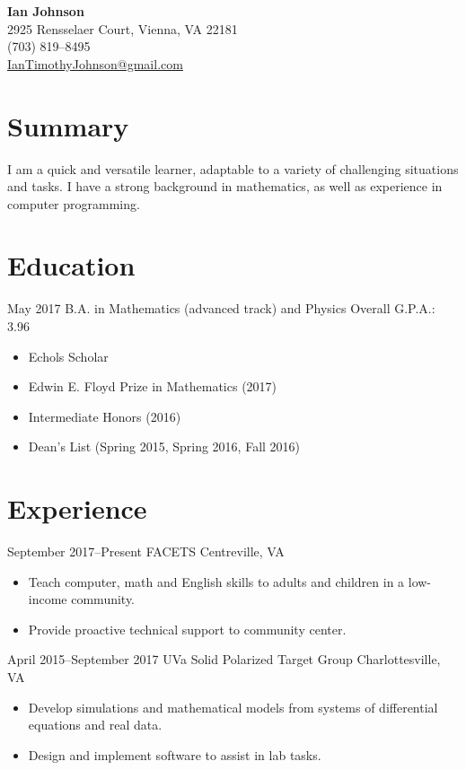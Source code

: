 \documentclass[10pt]{article}
\begin{document}
\begin{center}
  {\Large\bfseries Ian Johnson} \\
  2925 Rensselaer Court, Vienna, VA 22181 \\
  (703) 819--8495 \\
  \href{mailto:IanTimothyJohnson@gmail.com}{IanTimothyJohnson@gmail.com}
\end{center}

\section*{Summary}
I am a quick and versatile learner, adaptable to a variety of challenging
situations and tasks.  I have a strong background in mathematics, as well as
experience in computer programming.

\section*{Education}
{May 2017}
{B.A. in Mathematics (advanced track) and Physics}
{Overall G.P.A.: 3.96}
\begin{itemize}
\item Echols Scholar
\item Edwin E. Floyd Prize in Mathematics (2017)
\item Intermediate Honors (2016)
\item Dean's List (Spring 2015, Spring 2016, Fall 2016)
\end{itemize}

\section*{Experience}
{September 2017--Present}
{FACETS}
{Centreville, VA}
\begin{itemize}
\item Teach computer, math and English skills to adults and children in a low-income community.
\item Provide proactive technical support to community center.
\end{itemize}

{April 2015--September 2017}
{UVa Solid Polarized Target Group}
{Charlottesville, VA}
\begin{itemize}
\item Develop simulations and mathematical models from systems of differential equations and real data.
\item Design and implement software to assist in lab tasks.
\end{itemize}
\end{document}
